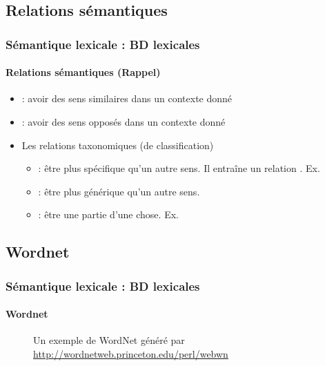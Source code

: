 \documentclass[xcolor=table]{beamer}
\begin{document}
\subsection{Relations sémantiques}

\begin{frame}
	\frametitle{Sémantique lexicale : BD lexicales}
	\framesubtitle{Relations sémantiques (Rappel)}
	
	\begin{itemize}
		\item {} : avoir des sens similaires dans un contexte donné
		\item {} : avoir des sens opposés dans un contexte donné
		\item Les relations taxonomiques (de classification)
		\begin{itemize}
			\item {} : être plus spécifique qu'un autre sens. Il entraîne un relation . Ex.  
			\item {} : être plus générique qu'un autre sens. 
			\item {} : être une partie d'une chose. Ex. 
		\end{itemize}
	\end{itemize}
	
\end{frame}

\subsection{Wordnet}

\begin{frame}
\frametitle{Sémantique lexicale : BD lexicales}
\framesubtitle{Wordnet}

\begin{minipage}{.3\textwidth}
	\begin{figure}
		\caption{Un exemple de WordNet généré par \url{http://wordnetweb.princeton.edu/perl/webwn}}
	\end{figure}
\end{minipage}
\begin{minipage}{.68\textwidth}
\end{minipage}
	
\end{frame}
\end{document}
